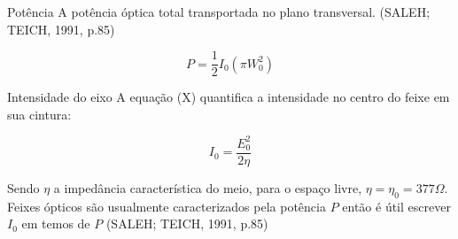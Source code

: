 \documentclass[numeric]{fei}
\begin{document}
Potência
A potência óptica total transportada no plano transversal. (SALEH; TEICH, 1991, p.85)

\begin{equation}
\label{eq:potencia}
P = \frac{1}{2}I_0(\pi W_0^2)
\end{equation}

Intensidade do eixo
A equação (X) quantifica a intensidade no centro do feixe em sua cintura:

\begin{equation}
\label{eq:intencidade_eixo}
I_0 = \frac{E_0^2}{2\eta}
\end{equation}

Sendo $\eta$ a impedância característica do meio, para o espaço livre, $\eta = \eta_0 = 377 \Omega$. Feixes ópticos são usualmente caracterizados pela potência $P$ então é útil escrever $I_0$ em temos de $P$ (SALEH; TEICH, 1991, p.85)

\cite{latexcompanion} \cite{einstein}

\printbibliography
\end{document}
